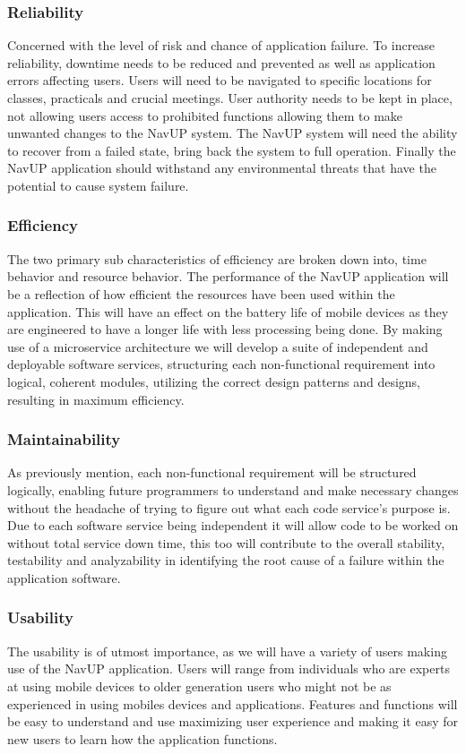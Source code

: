 \documentclass{article}
\begin{document}
		\subsubsection{Reliability}
		Concerned with the level of risk and chance of application failure. To increase reliability, downtime needs to be reduced and prevented as well as application errors affecting users. Users will need to be navigated to specific locations for classes, practicals and crucial meetings. User authority needs to be kept in place, not allowing users access to prohibited functions allowing them to make unwanted changes to the NavUP system. The NavUP system will need the ability to recover from a failed state, bring back the system to full operation. Finally the NavUP application should withstand any environmental threats that have the potential to cause system failure.
		 
		\subsubsection{Efficiency}
		The two primary sub characteristics of efficiency are broken down into, time behavior and resource behavior. The performance of the NavUP application will be a reflection of how efficient the resources have been used within the application. This will have an effect on the battery life of mobile devices as they are engineered to have a longer life with less processing being done.
		By making use of a microservice architecture we will develop a suite of independent and deployable software services, structuring each non-functional requirement into logical, coherent modules, utilizing the correct design patterns and designs, resulting in maximum efficiency.
		
		\subsubsection{Maintainability}
		As previously mention, each non-functional requirement will be structured logically, enabling future programmers to understand and make necessary changes without the headache of trying to figure out what each code service's purpose is. Due to each software service being independent it will allow code to be worked on without total service down time, this too will contribute to the overall stability, testability and analyzability in identifying the root cause of a failure within the application software.
		
		\subsubsection{Usability}
		The usability is of utmost importance, as we will have a variety of users making use of the NavUP application. Users will range from individuals who are experts at using mobile devices to older generation users who might not be as experienced in using mobiles devices and applications. Features and functions will be easy to understand and use maximizing user experience and making it easy for new users to learn how the application functions.		
	
\end{document}
